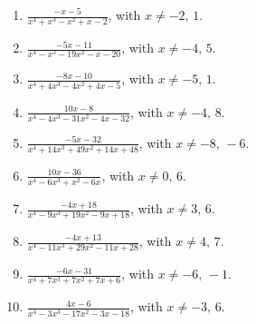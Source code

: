 \documentclass[11pt,oneside]{book}
\begin{document}
\begin{enumerate}[leftmargin=*,label=\textbf{M\arabic*.},itemsep=0.45\baselineskip]
\item $\displaystyle \frac{- x - 5}{x^{4} + x^{3} - x^{2} + x - 2}$, with $x\ne -2,\,1$.
\item $\displaystyle \frac{- 5 x - 11}{x^{4} - x^{3} - 19 x^{2} - x - 20}$, with $x\ne -4,\,5$.
\item $\displaystyle \frac{- 8 x - 10}{x^{4} + 4 x^{3} - 4 x^{2} + 4 x - 5}$, with $x\ne -5,\,1$.
\item $\displaystyle \frac{10 x - 8}{x^{4} - 4 x^{3} - 31 x^{2} - 4 x - 32}$, with $x\ne -4,\,8$.
\item $\displaystyle \frac{- 5 x - 32}{x^{4} + 14 x^{3} + 49 x^{2} + 14 x + 48}$, with $x\ne -8,\,-6$.
\item $\displaystyle \frac{10 x - 36}{x^{4} - 6 x^{3} + x^{2} - 6 x}$, with $x\ne 0,\,6$.
\item $\displaystyle \frac{- 4 x + 18}{x^{4} - 9 x^{3} + 19 x^{2} - 9 x + 18}$, with $x\ne 3,\,6$.
\item $\displaystyle \frac{- 4 x + 13}{x^{4} - 11 x^{3} + 29 x^{2} - 11 x + 28}$, with $x\ne 4,\,7$.
\item $\displaystyle \frac{- 6 x - 31}{x^{4} + 7 x^{3} + 7 x^{2} + 7 x + 6}$, with $x\ne -6,\,-1$.
\item $\displaystyle \frac{4 x - 6}{x^{4} - 3 x^{3} - 17 x^{2} - 3 x - 18}$, with $x\ne -3,\,6$.
\end{enumerate}
\end{document}
